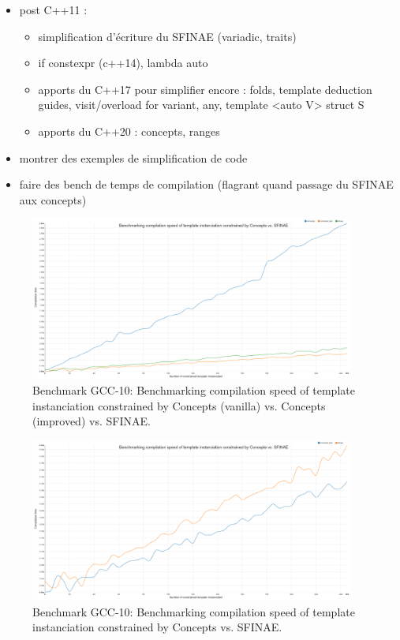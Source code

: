 \begin{itemize}
  \item post C++11 :
        \begin{itemize}
          \item simplification d'écriture du SFINAE (variadic, traits)
          \item if constexpr (c++14), lambda auto
          \item apports du C++17 pour simplifier encore : folds, template deduction guides, visit/overload for variant, any, template <auto V> struct S
          \item apports du C++20 : concepts, ranges
        \end{itemize}
  \item montrer des exemples de simplification de code
  \item faire des bench de temps de compilation (flagrant quand passage du SFINAE aux concepts)
\end{itemize}

\begin{figure}[htb]
  \centering
  \includegraphics[width=4.2in]{figs/compile_time_benches/gcc10/chart.concept.png}
  \caption{Benchmark GCC-10: Benchmarking compilation speed of template instanciation constrained by Concepts (vanilla) vs. Concepts (improved) vs. SFINAE.}
  \label{fig.gen.bench.gcc10.1.concept.sfinae}
\end{figure}

\begin{figure}[htb]
  \centering
  \includegraphics[width=4.2in]{figs/compile_time_benches/gcc10/chart.concept2.png}
  \caption{Benchmark GCC-10: Benchmarking compilation speed of template instanciation constrained by Concepts vs. SFINAE.}
  \label{fig.gen.bench.gcc10.2.concept.sfinae}
\end{figure}

